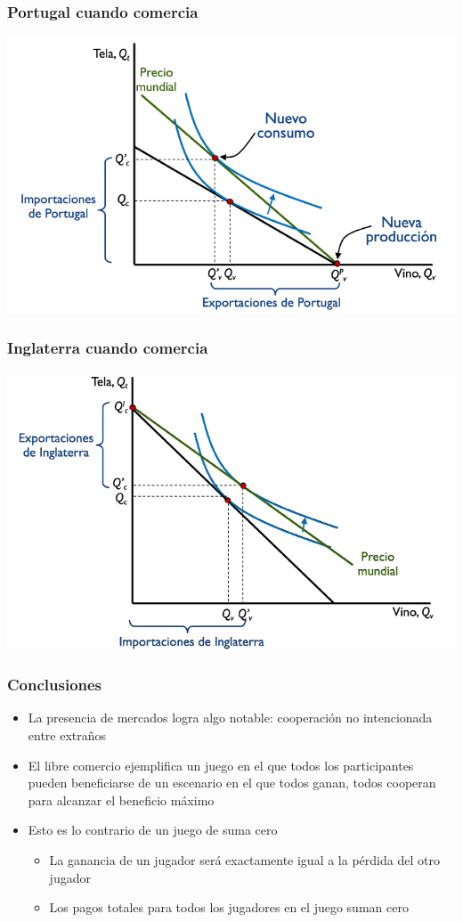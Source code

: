 \documentclass{beamer}
\begin{document}
\begin{frame}
\frametitle{ Portugal cuando comercia}
\centering
\includegraphics[scale=0.6]{Figures/Tema_03_5_portugal3.png}
\end{frame}

\begin{frame}
\frametitle{Inglaterra cuando comercia}
\centering
\includegraphics[scale=0.6]{Figures/Tema_03_6_inglaterra3.png}
\end{frame}

\begin{frame}
\frametitle{Conclusiones}
\begin{itemize}
    \item La presencia de mercados logra algo notable: cooperación no intencionada entre extraños
    \item El libre comercio ejemplifica un juego en el que todos los participantes pueden beneficiarse de un escenario en el que todos ganan, todos cooperan para alcanzar el beneficio máximo 
    \item Esto es lo contrario de un juego de suma cero
    \begin{itemize}
    \item La ganancia de un jugador será exactamente igual a la pérdida del otro jugador
    \item Los pagos totales para todos los jugadores en el juego suman cero
    \end{itemize}
\end{itemize}
\end{frame}
\end{document}
